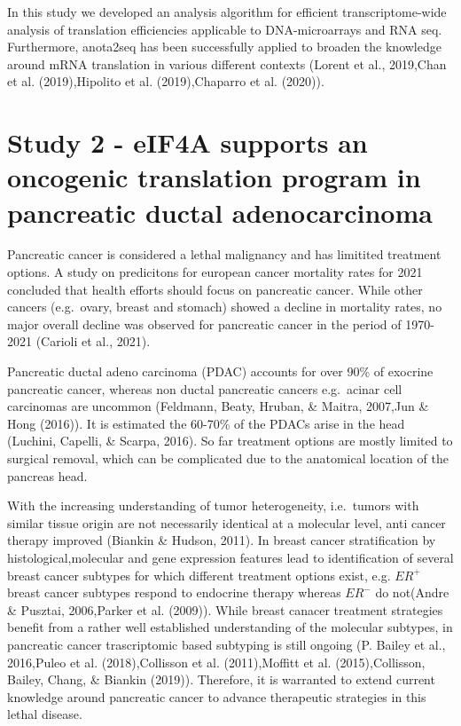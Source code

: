 \documentclass[12pt,openany]{book}
\begin{document}
In this study we developed an analysis algorithm for efficient
transcriptome-wide analysis of translation efficiencies applicable to
DNA-microarrays and RNA seq. Furthermore, anota2seq has been
successfully applied to broaden the knowledge around mRNA translation in
various different contexts (Lorent et al., 2019,Chan et al.
(2019),Hipolito et al. (2019),Chaparro et al. (2020)).

\section{Study 2 - eIF4A supports an oncogenic translation program in pancreatic ductal adenocarcinoma}

Pancreatic cancer is considered a lethal malignancy and has limitited
treatment options. A study on predicitons for european cancer mortality
rates for 2021 concluded that health efforts should focus on pancreatic
cancer. While other cancers (e.g.~ovary, breast and stomach) showed a
decline in mortality rates, no major overall decline was observed for
pancreatic cancer in the period of 1970-2021 (Carioli et al., 2021).

Pancreatic ductal adeno carcinoma (PDAC) accounts for over 90\% of
exocrine pancreatic cancer, whereas non ductal pancreatic cancers
e.g.~acinar cell carcinomas are uncommon (Feldmann, Beaty, Hruban, \&
Maitra, 2007,Jun \& Hong (2016)). It is estimated the 60-70\% of the
PDACs arise in the head (Luchini, Capelli, \& Scarpa, 2016). So far
treatment options are mostly limited to surgical removal, which can be
complicated due to the anatomical location of the pancreas head.

With the increasing understanding of tumor heterogeneity, i.e.~tumors
with similar tissue origin are not necessarily identical at a molecular
level, anti cancer therapy improved (Biankin \& Hudson, 2011). In breast
cancer stratification by histological,molecular and gene expression
features lead to identification of several breast cancer subtypes for
which different treatment options exist, e.g. \(ER^+\) breast cancer
subtypes respond to endocrine therapy whereas \(ER^-\) do not(Andre \&
Pusztai, 2006,Parker et al. (2009)). While breast canacer treatment
strategies benefit from a rather well established understanding of the
molecular subtypes, in pancreatic cancer trascriptomic based subtyping
is still ongoing (P. Bailey et al., 2016,Puleo et al. (2018),Collisson
et al. (2011),Moffitt et al. (2015),Collisson, Bailey, Chang, \& Biankin
(2019)). Therefore, it is warranted to extend current knowledge around
pancreatic cancer to advance therapeutic strategies in this lethal
disease.
\end{document}
